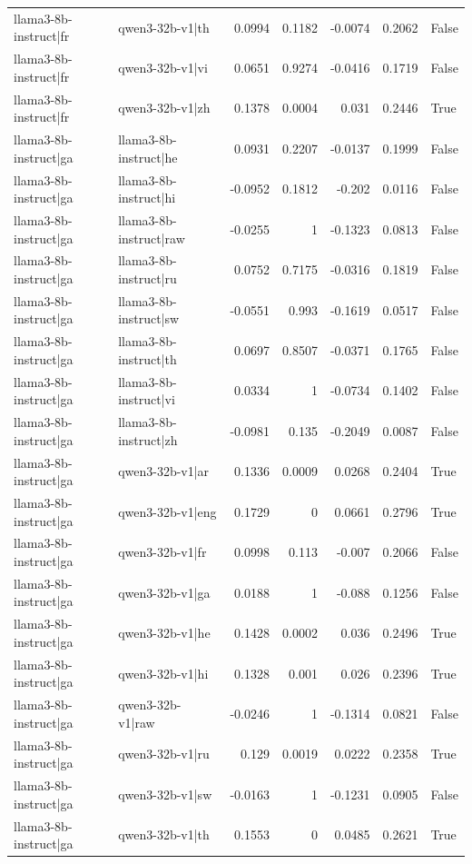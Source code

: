 \begin{table}
\begin{tabular}{l l r r r r l}
llama3-8b-instruct|fr & qwen3-32b-v1|th & 0.0994 & 0.1182 & -0.0074 & 0.2062 & False \\
llama3-8b-instruct|fr & qwen3-32b-v1|vi & 0.0651 & 0.9274 & -0.0416 & 0.1719 & False \\
llama3-8b-instruct|fr & qwen3-32b-v1|zh & 0.1378 & 0.0004 & 0.031 & 0.2446 & True \\
llama3-8b-instruct|ga & llama3-8b-instruct|he & 0.0931 & 0.2207 & -0.0137 & 0.1999 & False \\
llama3-8b-instruct|ga & llama3-8b-instruct|hi & -0.0952 & 0.1812 & -0.202 & 0.0116 & False \\
llama3-8b-instruct|ga & llama3-8b-instruct|raw & -0.0255 & 1 & -0.1323 & 0.0813 & False \\
llama3-8b-instruct|ga & llama3-8b-instruct|ru & 0.0752 & 0.7175 & -0.0316 & 0.1819 & False \\
llama3-8b-instruct|ga & llama3-8b-instruct|sw & -0.0551 & 0.993 & -0.1619 & 0.0517 & False \\
llama3-8b-instruct|ga & llama3-8b-instruct|th & 0.0697 & 0.8507 & -0.0371 & 0.1765 & False \\
llama3-8b-instruct|ga & llama3-8b-instruct|vi & 0.0334 & 1 & -0.0734 & 0.1402 & False \\
llama3-8b-instruct|ga & llama3-8b-instruct|zh & -0.0981 & 0.135 & -0.2049 & 0.0087 & False \\
llama3-8b-instruct|ga & qwen3-32b-v1|ar & 0.1336 & 0.0009 & 0.0268 & 0.2404 & True \\
llama3-8b-instruct|ga & qwen3-32b-v1|eng & 0.1729 & 0 & 0.0661 & 0.2796 & True \\
llama3-8b-instruct|ga & qwen3-32b-v1|fr & 0.0998 & 0.113 & -0.007 & 0.2066 & False \\
llama3-8b-instruct|ga & qwen3-32b-v1|ga & 0.0188 & 1 & -0.088 & 0.1256 & False \\
llama3-8b-instruct|ga & qwen3-32b-v1|he & 0.1428 & 0.0002 & 0.036 & 0.2496 & True \\
llama3-8b-instruct|ga & qwen3-32b-v1|hi & 0.1328 & 0.001 & 0.026 & 0.2396 & True \\
llama3-8b-instruct|ga & qwen3-32b-v1|raw & -0.0246 & 1 & -0.1314 & 0.0821 & False \\
llama3-8b-instruct|ga & qwen3-32b-v1|ru & 0.129 & 0.0019 & 0.0222 & 0.2358 & True \\
llama3-8b-instruct|ga & qwen3-32b-v1|sw & -0.0163 & 1 & -0.1231 & 0.0905 & False \\
llama3-8b-instruct|ga & qwen3-32b-v1|th & 0.1553 & 0 & 0.0485 & 0.2621 & True \\

\end{tabular}
\end{table}
